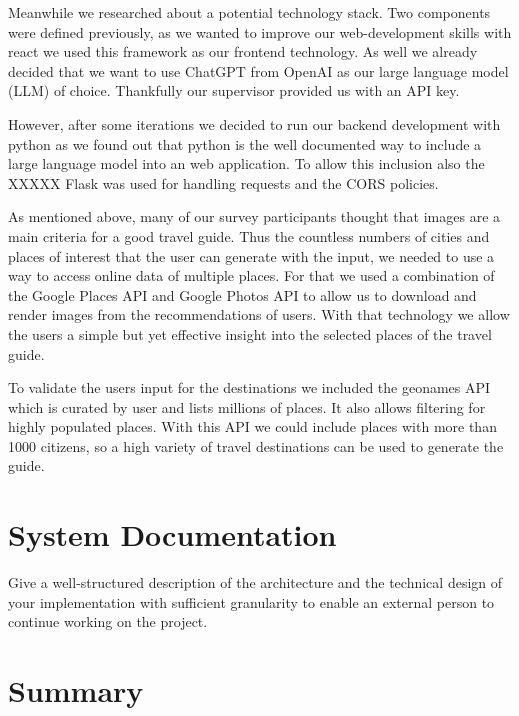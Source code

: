 \documentclass[english,notitlepage,smartquotes]{hgbreport}
\begin{document}
Meanwhile we researched about a potential technology stack. Two components were defined previously, as we wanted to improve our web-development skills with react we used this framework as our frontend technology. As well we already decided that we want to use ChatGPT from OpenAI as our large language model (LLM) of choice. Thankfully our supervisor provided us with an API key. 

However, after some iterations we decided to run our backend development with python as we found out that python is the well documented way to include a large language model into an web application. To allow this inclusion also the XXXXX Flask was used for handling requests and the CORS policies.

As mentioned above, many of our survey participants thought that images are a main criteria for a good travel guide. Thus the countless numbers of cities and places of interest that the user can generate with the input, we needed to use a way to access online data of multiple places. For that we used a combination of the Google Places API and Google Photos API to allow us to download and render images from the recommendations of users. With that technology we allow the users a simple but yet effective insight into the selected places of the travel guide. 

To validate the users input for the destinations we included the geonames API which is curated by user and lists millions of places. It also allows filtering for highly populated places. With this API we could include places with more than 1000 citizens, so a high variety of travel destinations can be used to generate the guide.




\chapter{System Documentation}

Give a well-structured description of the architecture and the technical design
of your implementation with sufficient granularity to enable an external person
to continue working on the project.

\chapter{Summary}
\end{document}
